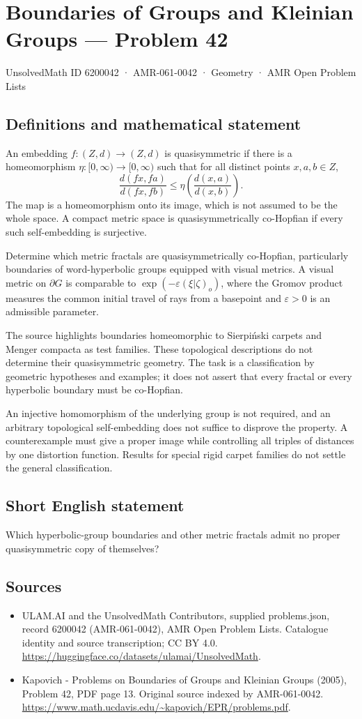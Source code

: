 \documentclass[11pt,a4paper]{article}
\begin{document}
\section*{Boundaries of Groups and Kleinian Groups — Problem 42}\label{6200042}
{\small UnsolvedMath ID 6200042 · AMR-061-0042 · Geometry · AMR Open Problem Lists}
\subsection{Definitions and mathematical statement}
An embedding $f:(Z,d)\to(Z,d)$ is quasisymmetric if there is a homeomorphism $\eta:[0,\infty)\to[0,\infty)$ such that for all distinct points $x,a,b\in Z$,
\[
 \frac{d(fx,fa)}{d(fx,fb)}
       \leq\eta\!\left(\frac{d(x,a)}{d(x,b)}\right).
\]
The map is a homeomorphism onto its image, which is not assumed to be the whole space. A compact metric space is quasisymmetrically co-Hopfian if every such self-embedding is surjective.

Determine which metric fractals are quasisymmetrically co-Hopfian, particularly boundaries of word-hyperbolic groups equipped with visual metrics. A visual metric on $\partial G$ is comparable to $\exp(-\varepsilon(\xi|\zeta)_o)$, where the Gromov product measures the common initial travel of rays from a basepoint and $\varepsilon>0$ is an admissible parameter.

The source highlights boundaries homeomorphic to Sierpi\'nski carpets and Menger compacta as test families. These topological descriptions do not determine their quasisymmetric geometry. The task is a classification by geometric hypotheses and examples; it does not assert that every fractal or every hyperbolic boundary must be co-Hopfian.

An injective homomorphism of the underlying group is not required, and an arbitrary topological self-embedding does not suffice to disprove the property. A counterexample must give a proper image while controlling all triples of distances by one distortion function. Results for special rigid carpet families do not settle the general classification.
\subsection{Short English statement}
Which hyperbolic-group boundaries and other metric fractals admit no proper quasisymmetric copy of themselves?
\subsection{Sources}
\begin{itemize}
\item[S1] ULAM.AI and the UnsolvedMath Contributors, supplied problems.json, record 6200042 (AMR-061-0042), AMR Open Problem Lists. Catalogue identity and source transcription; CC BY 4.0.
\url{https://huggingface.co/datasets/ulamai/UnsolvedMath}.
\item[S2] Kapovich - Problems on Boundaries of Groups and Kleinian Groups (2005), Problem 42, PDF page 13. Original source indexed by AMR-061-0042.
\url{https://www.math.ucdavis.edu/~kapovich/EPR/problems.pdf}.
\end{itemize}
\end{document}
